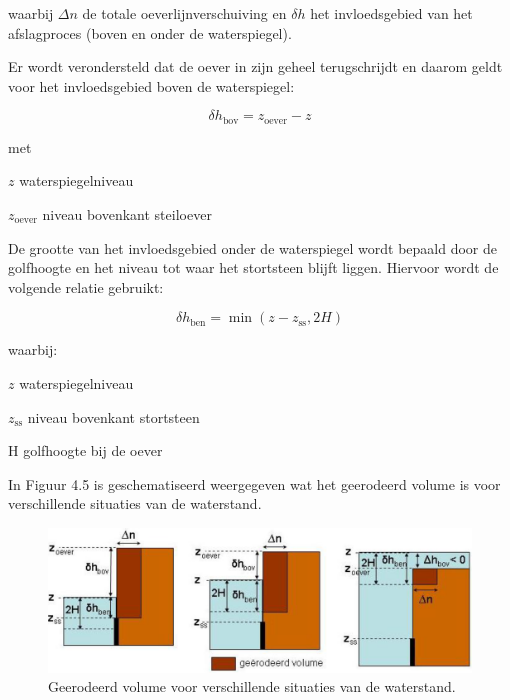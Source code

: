 waarbij $\Delta n$ de totale oeverlijnverschuiving en $\delta h$ het invloedsgebied van het afslagproces (boven en onder de waterspiegel).

Er wordt verondersteld dat de oever in zijn geheel terugschrijdt en daarom geldt voor het invloedsgebied boven de waterspiegel:

\begin{equation}
\delta h_\text{bov} = z_\text{oever} - z
\end{equation}

met

\begin{symbollist}
\item[$z$] waterspiegelniveau 
\item[$z_\text{oever}$] niveau bovenkant steiloever 
\end{symbollist}

De grootte van het invloedsgebied onder de waterspiegel wordt bepaald door de golfhoogte en het niveau tot waar het stortsteen blijft liggen.
Hiervoor wordt de volgende relatie gebruikt:

\begin{equation}
\delta h_\text{ben} = \min ( z-z_\text{ss}, 2 H )
\end{equation}

waarbij:

\begin{symbollist}
\item{$z$} waterspiegelniveau 
\item{$z_\text{ss}$} niveau bovenkant stortsteen 
\item{H} golfhoogte bij de oever 
\end{symbollist}

In Figuur 4.5 is geschematiseerd weergegeven wat het geerodeerd volume is voor verschillende situaties van de waterstand.


\begin{figure}
\includegraphics[width=\textwidth]{figures/Fig4-5.png}
\caption{Geerodeerd volume voor verschillende situaties van de waterstand.}
\label{Fig4.5}
\end{figure}

